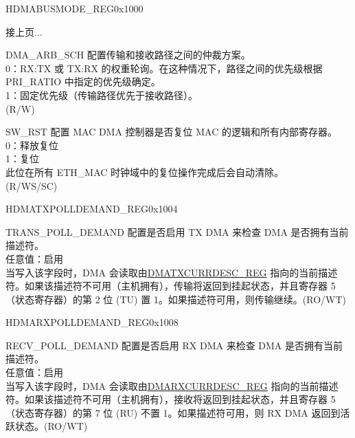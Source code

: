 \addtocounter{Regfloat}{-1}
\begin{register}{H}{DMABUSMODE\_REG}{0x1000}
\begin{regdesc}\begin{reglist}
\item [接上页...]

\item [DMA\_ARB\_SCH] 配置传输和接收路径之间的仲裁方案。\\
0：RX:TX 或 TX:RX 的权重轮询。在这种情况下，路径之间的优先级根据 PRI\_RATIO 中指定的优先级确定。\\
1：固定优先级（传输路径优先于接收路径）。\\(R/W)
\item [SW\_RST] 配置 MAC DMA 控制器是否复位 MAC 的逻辑和所有内部寄存器。\\
0：释放复位\\
1：复位\\
此位在所有 ETH\_MAC 时钟域中的复位操作完成后会自动清除。\\ (R/WS/SC)
\end{reglist}\end{regdesc}
\end{register}


\begin{register}{H}{DMATXPOLLDEMAND\_REG}{0x1004}\label{regdesc:DMATXPOLLDEMANDREG}
%
\regnewline%
\begin{regdesc}\begin{reglist}
\item [TRANS\_POLL\_DEMAND] 配置是否启用 TX DMA 来检查 DMA 是否拥有当前描述符。\\
任意值：启用\\
当写入该字段时，DMA 会读取由\hyperref[regdesc:DMATXCURRDESCREG]{DMATXCURRDESC\_REG} 指向的当前描述符。如果该描述符不可用（主机拥有），传输将返回到挂起状态，并且寄存器 5（状态寄存器）的第 2 位 (TU) 置 1。如果描述符可用，则传输继续。(RO/WT)
\end{reglist}\end{regdesc}
\end{register}


\begin{register}{H}{DMARXPOLLDEMAND\_REG}{0x1008}\label{regdesc:DMARXPOLLDEMANDREG}
%
\regnewline%
\begin{regdesc}\begin{reglist}
\item [RECV\_POLL\_DEMAND] 配置是否启用 RX DMA 来检查 DMA 是否拥有当前描述符。\\
任意值：启用\\
当写入该字段时，DMA 会读取由\hyperref[regdesc:DMARXCURRDESCREG]{DMARXCURRDESC\_REG} 指向的当前描述符。如果该描述符不可用（主机拥有），接收将返回到挂起状态，并且寄存器 5（状态寄存器）的第 7 位 (RU) 不置 1。如果描述符可用，则 RX DMA 返回到活跃状态。(RO/WT)
\end{reglist}\end{regdesc}
\end{register}



